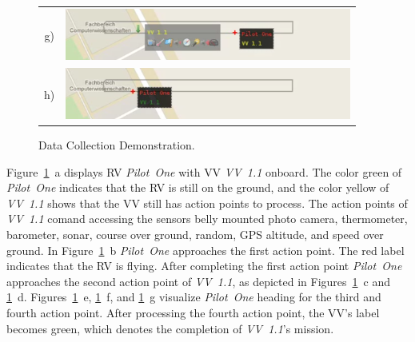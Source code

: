 \begin{figure}[h]
\begin{center}
\begin{tabular}{cc}
			g)&{\includegraphics[width=9.4cm]{ese-demo1-7.png}} \\
			h)&{\includegraphics[width=9.4cm]{ese-demo1-8.png}}
		\end{tabular}
	\end{center}
	\caption{Data Collection Demonstration.\label{fig:demo1}}
\end{figure}
Figure~\ref{fig:demo1}~a displays \ac{RV} \textit{Pilot~One} with \ac{VV} \textit{VV~1.1} onboard.
The color green of \textit{Pilot~One} indicates that the \ac{RV} is still on the ground, and the
color yellow of \textit{VV~1.1} shows that the \ac{VV} still has action points to process.
The action points of \textit{VV~1.1} comand accessing the sensors belly mounted photo camera, thermometer,
barometer, sonar, course over ground, random, GPS altitude, and speed over ground. 
In Figure~\ref{fig:demo1}~b \textit{Pilot~One} approaches the first action point. The red label indicates
that the \ac{RV} is flying. After completing the first action point \textit{Pilot~One} approaches the
second action point of \textit{VV~1.1}, as depicted in Figures~\ref{fig:demo1}~c and \ref{fig:demo1}~d.
Figures~\ref{fig:demo1}~e, \ref{fig:demo1}~f, and \ref{fig:demo1}~g visualize \textit{Pilot~One} heading
for the third and fourth action point. After processing the fourth action point, the \ac{VV}'s label
becomes green, which denotes the completion of \textit{VV~1.1}'s mission.

